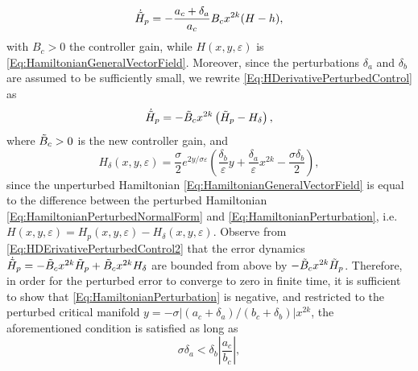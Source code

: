 \documentclass[3p]{elsarticle}
\theoremstyle{plain}
\theoremstyle{remark}
\theoremstyle{definition}
\begin{document}
    \begin{equation}
        \dot{\Tilde{H}}_{p} = -\frac{a_{c}+\delta_{a}}{a_{c}}B_{c}x^{2k}(H-h),
        \label{Eq:HDerivativePerturbedControl}
    \end{equation}
    with $B_{c}>0$ the controller gain, while $H(x,y,\varepsilon)$ is \eqref{Eq:HamiltonianGeneralVectorField}. Moreover, since the perturbations $\delta_{a}$ and $\delta_{b}$ are assumed to be sufficiently small, we rewrite \eqref{Eq:HDerivativePerturbedControl} as
    \begin{equation}
        \dot{\Tilde{H}}_{p} = -\Tilde{B}_{c}x^{2k}\left( \Tilde{H}_{p} - H_{\delta}\right),
        \label{Eq:HDErivativePerturbedControl2}
    \end{equation}
    where $\Tilde{B}_{c}>0$ is the new controller gain, and
    \begin{equation}
        H_{\delta}(x,y,\varepsilon) = \frac{\sigma}{2}e^{2y/\sigma \varepsilon}\left( \frac{\delta_{b}}{\varepsilon}y + \frac{\delta_{a}}{\varepsilon}x^{2k} - \frac{\sigma \delta_{b}}{2} \right),
        \label{Eq:HamiltonianPerturbation}
    \end{equation}
    since the unperturbed Hamiltonian \eqref{Eq:HamiltonianGeneralVectorField} is equal to the difference between the perturbed Hamiltonian \eqref{Eq:HamiltonianPerturbedNormalForm} and \eqref{Eq:HamiltonianPerturbation}, i.e. $H(x,y,\varepsilon) = H_{p}(x,y,\varepsilon) - H_{\delta}(x,y,\varepsilon)$. Observe from \eqref{Eq:HDErivativePerturbedControl2} that the error dynamics $\dot{\Tilde{H}}_{p} = -\Tilde{B}_{c}x^{2k}\Tilde{H}_{p} + \Tilde{B}_{c}x^{2k}H_{\delta}$ are bounded from above by $-\Tilde{B}_{c}x^{2k}\Tilde{H}_{p}$. Therefore, in order for the perturbed error to converge to zero in finite time, it is sufficient to show that \eqref{Eq:HamiltonianPerturbation} is negative, and restricted to the perturbed critical manifold $y = -\sigma|(a_{c}+\delta_{a})/(b_{c}+\delta_{b})|x^{2k}$, the aforementioned condition is satisfied as long as
    \begin{equation}
        \sigma \delta_{a} < \delta_{b}\left| \frac{a_{c}}{b_{c}} \right|,
    \label{Eq:ConditionPerturbationStability}
    \end{equation}
\end{document}
